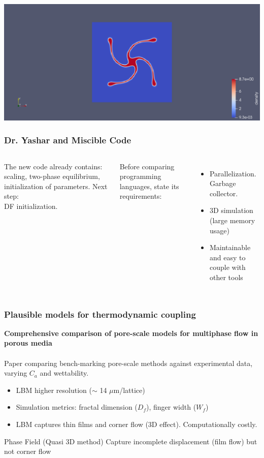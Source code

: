 \documentclass{beamer}
\begin{document}
\begin{frame}
		\includegraphics[scale=0.2]{pics/rotatingDroplet.pdf}
	\end{frame}

	\begin{frame}
		\frametitle{Dr. Yashar and Miscible Code}
		\begin{columns}[T]
			
			\justifying
			The new code already contains: scaling,	two-phase equilibrium, initialization of parameters. Next step:\\ DF initialization.
			
			Before comparing programming languages, state its requirements:
			\begin{itemize}
				\item Parallelization. Garbage collector. 
				\item 3D simulation (large memory usage)
				\item Maintainable and easy to couple with other tools
			\end{itemize}
		\end{columns}
	\end{frame}

	\begin{frame}
		\frametitle{Plausible models for thermodynamic coupling}
		\centering
		\textbf{Comprehensive comparison of pore-scale models for multiphase flow in porous media}\\~\\
		\justifying
		Paper comparing bench-marking pore-scale methods against experimental data, varying $C_a$ and wettability.
		
		\begin{itemize}
			\item LBM higher resolution ($\sim$ 14 $\mu$m/lattice)
			\item Simulation metrics: fractal dimension ($D_f$), finger width ($W_f$)
			\item LBM captures thin films and corner flow (3D effect). Computationally costly.
		\end{itemize}
		\begin{block}{Phase Field (Quasi 3D method)}
			Capture incomplete displacement (film flow) but not corner flow
		\end{block}
		
	\end{frame}
	
\end{document}
